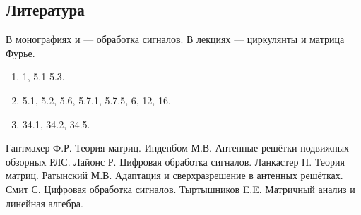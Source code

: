 \documentclass[a4paper,12pt]{article}
\begin{document}
\subsection{Литература}

В монографиях \cite{Lyons} и \cite{Smith} --- обработка сигналов. В лекциях \cite{Tyrtyshnikov} --- циркулянты и матрица Фурье.

\begin{enumerate}
    \item [\cite{Lyons}] 1, 5.1-5.3.
    \item [\cite{Smith}] 5.1, 5.2, 5.6, 5.7.1, 5.7.5, 6, 12, 16.
    \item [\cite{Tyrtyshnikov}] 34.1, 34.2, 34.5.
\end{enumerate}

\begin{thebibliography}{6}
     Гантмахер Ф.Р. Теория матриц.
     Инденбом М.В. Антенные решётки подвижных обзорных РЛС.
     Лайонс Р. Цифровая обработка сигналов.
     Ланкастер П. Теория матриц.
     Ратынский М.В. Адаптация и сверхразрешение в антенных решётках.
     Смит С. Цифровая обработка сигналов.
     Тыртышников E.E. Матричный анализ и линейная алгебра.
\end{thebibliography}
\end{document}
